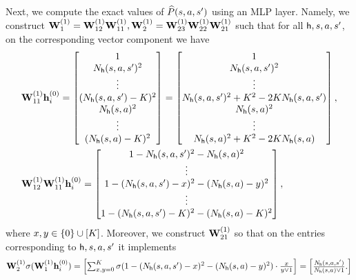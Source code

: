 Next, we compute the exact values of $\widehat{P}({s},{a},{s}')$ using an MLP layer. Namely,
we  construct ${\mathbf W}^{(1)}_1={\mathbf W}^{(1)}_{12}{\mathbf W}^{(1)}_{11},{\mathbf W}^{(1)}_2={\mathbf W}^{(1)}_{23}{\mathbf W}^{(1)}_{22}{\mathbf W}^{(1)}_{21}$  such that for all ${\mathsf{h}},{s},{a},{s}'$, on the corresponding vector component we have
\begin{align*}
   & {\mathbf W}^{(1)}_{11}{\mathbf h}_i^{(0)}=     \begin{bmatrix}
    1\\
       {N}_{\mathsf{h}}({s},{a},{s}')^2 \\\vdots
       \\
        ({N}_{\mathsf{h}}({s},{a},{s}')-{K})^2\\
         {N}_{\mathsf{h}}({s},{a})^2 \\\vdots
       \\
        ({N}_{\mathsf{h}}({s},{a})-{K})^2
    \end{bmatrix}= \begin{bmatrix}
    1\\
       {N}_{\mathsf{h}}({s},{a},{s}')^2 \\\vdots
       \\
        {N}_{\mathsf{h}}({s},{a},{s}')^2+{K}^2-2{K}{N}_{\mathsf{h}}({s},{a},{s}')\\
          {N}_{\mathsf{h}}({s},{a})^2 \\\vdots
       \\
        {N}_{\mathsf{h}}({s},{a})^2+{K}^2-2{K}{N}_{\mathsf{h}}({s},{a})
    \end{bmatrix},
    \\
&{\mathbf W}^{(1)}_{12}{\mathbf W}^{(1)}_{11}{\mathbf h}_i^{(0)}=     \begin{bmatrix}
    1-
       {N}_{\mathsf{h}}({s},{a},{s}')^2 - {N}_{\mathsf{h}}({s},{a})^2 \\\vdots
       \\ 1-
       ({N}_{\mathsf{h}}({s},{a},{s}')-x)^2 - ({N}_{\mathsf{h}}({s},{a})-y)^2 \\\vdots\\
       1- ({N}_{\mathsf{h}}({s},{a},{s}')-{K})^2-({N}_{\mathsf{h}}({s},{a})-{K})^2
    \end{bmatrix} ,
\end{align*} where $x,y\in\{0\}\cup[{K}]$. Moreover,  we construct ${\mathbf W}^{(1)}_{21}$ so that on the entries corresponding to ${\mathsf{h}},{s},{a},{s}'$ it implements
\begin{align*}
{\mathbf W}_{2}^{(1)}\sigma({\mathbf W}_{1}^{(1)}{\mathbf h}_i^{(0)})
    =\begin{bmatrix}
        \sum_{x,y=0}^{{K}}\sigma(1- ({N}_{\mathsf{h}}({s},{a},{s}')-x)^2 - ({N}_{\mathsf{h}}({s},{a})-y)^2)\cdot\frac{x}{y\vee1}
    \end{bmatrix}=\begin{bmatrix}
        \frac{{N}_{\mathsf{h}}({s},{a},{s}')}{{N}_{\mathsf{h}}({s},{a})\vee1}.
    \end{bmatrix}
\end{align*}

